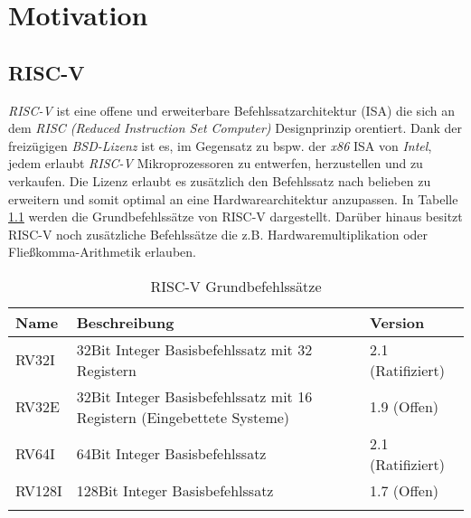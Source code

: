 \chapter{Motivation}

    \section{RISC-V}
        \textit{RISC-V} ist eine offene und erweiterbare Befehlssatzarchitektur (ISA) die sich an dem
        \textit{RISC (Reduced Instruction Set Computer)} Designprinzip orentiert.
        Dank der freizügigen \textit{BSD-Lizenz} ist es, im Gegensatz zu bspw. der \textit{x86} ISA von \textit{Intel},
        jedem erlaubt \textit{RISC-V} Mikroprozessoren zu entwerfen, herzustellen und zu verkaufen.
        Die Lizenz erlaubt es zusätzlich den Befehlssatz nach belieben zu erweitern und somit
        optimal an eine Hardwarearchitektur anzupassen.
        In Tabelle \ref{label:riscv-base} werden die Grundbefehlssätze von RISC-V dargestellt.
        Darüber hinaus besitzt RISC-V noch zusätzliche Befehlssätze die z.B. Hardwaremultiplikation
        oder Fließkomma-Arithmetik erlauben. \cite{riscv-isa-specs}
        
        \begin{center}
            \begin{longtable}{| l | l | l |}
                \hline
                    Name & Beschreibung & Version \\
                \hline
                    RV32I & 32Bit Integer Basisbefehlssatz mit 32 Registern & 2.1 (Ratifiziert)\\
                \hline
                    RV32E & 32Bit Integer Basisbefehlssatz mit 16 Registern (Eingebettete Systeme) & 1.9 (Offen)\\
                \hline
                    RV64I & 64Bit Integer Basisbefehlssatz & 2.1 (Ratifiziert)\\
                \hline
                    RV128I & 128Bit Integer Basisbefehlssatz & 1.7 (Offen)\\
                \hline
                \caption{RISC-V Grundbefehlssätze}
                \label{label:riscv-base}
            \end{longtable}
        \end{center}

